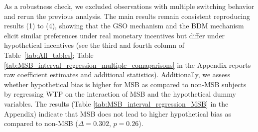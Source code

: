 \documentclass[12pt]{article}
\begin{document}
As a robustness check, we excluded observations with multiple switching behavior and rerun the previous analysis.
The main results remain consistent reproducing results (1) to (4), showing that the GSO mechanism and the BDM mechanism elicit similar preferences under real monetary incentives but differ under hypothetical incentives (see the third and fourth column of Table~\ref{tab:All_tables}; Table \ref{tab:MSB_interval_regression_multiple_comaparisons} in the Appendix reports raw coefficient estimates and additional statistics). 
Additionally, we assess whether hypothetical bias is higher for MSB  as compared to non-MSB subjects by regressing WTP on the interaction of MSB and the hypothetical dummy variables. The results (Table \ref{tab:MSB_interval_regression_MSB} in the Appendix) indicate that MSB does not lead to higher hypothetical bias as compared to non-MSB (\(\Delta = 0.302\), \(p =0.26\)). 
\end{document}
